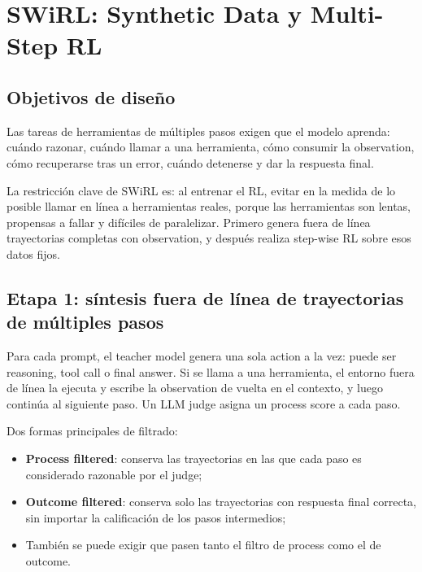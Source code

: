 \section{SWiRL: Synthetic Data y Multi-Step RL}

\subsection{Objetivos de diseño}

Las tareas de herramientas de múltiples pasos exigen que el modelo aprenda: cuándo razonar, cuándo llamar a una herramienta, cómo consumir la observation, cómo recuperarse tras un error, cuándo detenerse y dar la respuesta final.



La restricción clave de SWiRL es: al entrenar el RL, evitar en la medida de lo posible llamar en línea a herramientas reales, porque las herramientas son lentas, propensas a fallar y difíciles de paralelizar. Primero genera fuera de línea trayectorias completas con observation, y después realiza step-wise RL sobre esos datos fijos.

\subsection{Etapa 1: síntesis fuera de línea de trayectorias de múltiples pasos}

Para cada prompt, el teacher model genera una sola action a la vez: puede ser reasoning, tool call o final answer. Si se llama a una herramienta, el entorno fuera de línea la ejecuta y escribe la observation de vuelta en el contexto, y luego continúa al siguiente paso. Un LLM judge asigna un process score a cada paso.


Dos formas principales de filtrado:

\begin{itemize}
    \item \textbf{Process filtered}: conserva las trayectorias en las que cada paso es considerado razonable por el judge;
    \item \textbf{Outcome filtered}: conserva solo las trayectorias con respuesta final correcta, sin importar la calificación de los pasos intermedios;
    \item También se puede exigir que pasen tanto el filtro de process como el de outcome.
\end{itemize}

